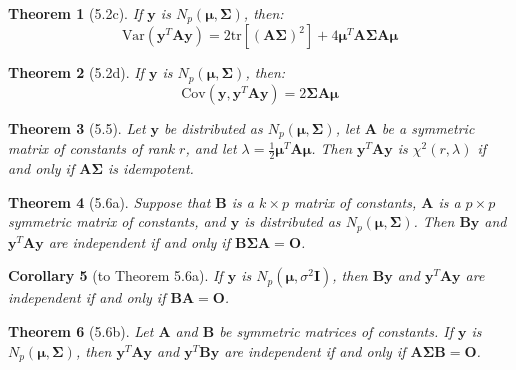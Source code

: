 \documentclass{article}
\newtheorem{theorem}{Theorem}[section]
\newtheorem{corollary}[theorem]{Corollary}
\begin{document}
\begin{theorem}[5.2c]
If $\mathbf{y}$ is $N_p(\boldsymbol{\mu}, \boldsymbol{\Sigma})$, then:
\[\text{Var}(\mathbf{y}^T\mathbf{A}\mathbf{y}) = 2\text{tr}[(\mathbf{A}\boldsymbol{\Sigma})^2] + 4\boldsymbol{\mu}^T\mathbf{A}\boldsymbol{\Sigma}\mathbf{A}\boldsymbol{\mu}\]
\end{theorem}

\begin{theorem}[5.2d]
If $\mathbf{y}$ is $N_p(\boldsymbol{\mu}, \boldsymbol{\Sigma})$, then:
\[\text{Cov}(\mathbf{y}, \mathbf{y}^T\mathbf{A}\mathbf{y}) = 2\boldsymbol{\Sigma}\mathbf{A}\boldsymbol{\mu}\]
\end{theorem}

\begin{theorem}[5.5]
Let $\mathbf{y}$ be distributed as $N_p(\boldsymbol{\mu}, \boldsymbol{\Sigma})$, let $\mathbf{A}$ be a symmetric matrix of constants of rank $r$, and let $\lambda = \frac{1}{2}\boldsymbol{\mu}^T \mathbf{A} \boldsymbol{\mu}$. Then $\mathbf{y}^T\mathbf{A}\mathbf{y}$ is $\chi^2(r, \lambda)$ if and only if $\mathbf{A}\boldsymbol{\Sigma}$ is idempotent.
\end{theorem}

\begin{theorem}[5.6a]
Suppose that $\mathbf{B}$ is a $k \times p$ matrix of constants, $\mathbf{A}$ is a $p \times p$ symmetric matrix of constants, and $\mathbf{y}$ is distributed as $N_p(\boldsymbol{\mu},\boldsymbol{\Sigma})$. Then $\mathbf{B}\mathbf{y}$ and $\mathbf{y}^T\mathbf{A}\mathbf{y}$ are independent if and only if $\mathbf{B}\boldsymbol{\Sigma}\mathbf{A} = \mathbf{O}$.
\end{theorem}

\begin{corollary}[to Theorem 5.6a]
If $\mathbf{y}$ is $N_p(\boldsymbol{\mu},\sigma^2\mathbf{I})$, then $\mathbf{B}\mathbf{y}$ and $\mathbf{y}^T\mathbf{A}\mathbf{y}$ are independent if and only if $\mathbf{B}\mathbf{A} = \mathbf{O}$.
\end{corollary}

\begin{theorem}[5.6b]
Let $\mathbf{A}$ and $\mathbf{B}$ be symmetric matrices of constants. If $\mathbf{y}$ is $N_p(\boldsymbol{\mu}, \boldsymbol{\Sigma})$, then $\mathbf{y}^T\mathbf{A}\mathbf{y}$ and $\mathbf{y}^T\mathbf{B}\mathbf{y}$ are independent if and only if $\mathbf{A}\boldsymbol{\Sigma}\mathbf{B} = \mathbf{O}$.
\end{theorem}
\end{document}
